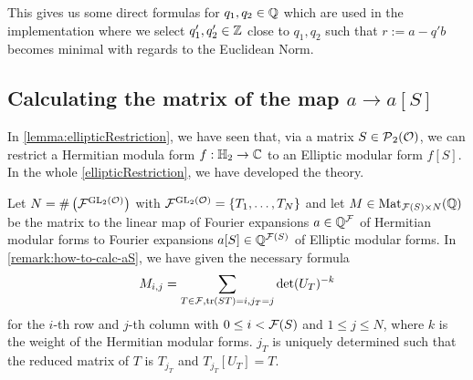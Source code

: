 This gives us some direct formulas for $q_1,q_2 \in \mathbb{Q}$ which are used in the  implementation where we select $q'_1, q'_2 \in \mathbb{Z}$ close to $q_1,q_2$ such that $r := a - q' b$ becomes minimal with regards to the Euclidean Norm.


\subsection{Calculating the matrix of the map $a \rightarrow a[S]$}
\label{impl:calcMatrix}
\label{calcMatrix}
\label{calcMatrixTrans}

In \cref{lemma:ellipticRestriction}, we have seen that, via a matrix $S \in \operatorname{\mathcal{P}}_2(\mathcal{O})$, we can restrict a Hermitian modula form $f : \mathbb{H}_2 \rightarrow \mathbb{C}$ to an Elliptic modular form $f[S]$. In the whole \cref{ellipticRestriction}, we have developed the theory.

Let $N = \# \left( {\mathcal{F}}^{\operatorname{GL}_2(\mathcal{O})} \right)$ with $\invarF{\F}{\GL_2(\curlO)} = \Set{T_1,\dots,T_N}$ and let $M \in \operatorname{Mat}_{\mathcal{F}(S) \times N}(\mathbb{Q})$ be the matrix to the linear map of Fourier expansions $a \in \mathbb{Q}^{\mathcal{F}}$ of Hermitian modular forms to Fourier expansions $a[S] \in \mathbb{Q}^{\mathcal{F}(S)}$ of Elliptic modular forms. In \cref{remark:how-to-calc-aS}, we have given the necessary formula
\[ M_{i,j} =  \sum_{T \in \mathcal{F}, \textup{\textrm{tr}}(S T) = i, j_T = j} \det(U_T)^{-k} \]
for the $i$-th row and $j$-th column with $0 \le i < \mathcal{F}(S)$ and $1 \le j \le N$, where $k$ is the weight of the Hermitian modular forms. $j_T$ is uniquely determined such that the reduced matrix of $T$ is $T_{j_T}$ and $T_{j_T}[U_T] = T$. 

